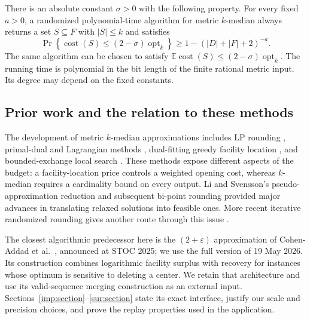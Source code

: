 \begin{theorem}\label{main:theorem}
There is an absolute constant $\sigma>0$ with the following property.
For every fixed $a>0$, a randomized polynomial-time algorithm for metric
$k$-median always returns a set $S\subseteq F$ with $|S|\le k$ and satisfies
\[
 \Pr\!\left\{\operatorname{cost}(S)
       \le(2-\sigma)\operatorname{opt}_k\right\}
 \ge 1-(|D|+|F|+2)^{-a}.
\]
The same algorithm can be chosen to satisfy
$\mathbb E\operatorname{cost}(S)\le(2-\sigma)\operatorname{opt}_k$.
The running time is polynomial in the bit length of the finite rational
metric input. Its degree may depend on the fixed constants.
\end{theorem}

\subsection{Prior work and the relation to these methods}

The development of metric $k$-median approximations includes LP rounding
\cite{CharikarGuhaTardosShmoys2002}, primal-dual and Lagrangian methods
\cite{JainVazirani2001}, dual-fitting greedy facility location
\cite{JMS2002,JainEtAl2003}, and bounded-exchange local search
\cite{Arya2004}.  These methods expose different aspects of the budget:
a facility-location price controls a weighted opening cost, whereas
$k$-median requires a cardinality bound on every output.  Li and
Svensson's pseudo-approximation reduction \cite{LiSvensson2016} and
subsequent bi-point rounding \cite{ByrkaEtAl2017,GowdaEtAl2023}
provided major advances in translating relaxed solutions into feasible
ones.  More recent iterative randomized rounding gives another route
through this issue \cite{ByrkaEtAl2026}.

The closest algorithmic predecessor here is the $(2+\varepsilon)$
approximation of Cohen-Addad et al.\ \cite{CGLSS2026}, announced at
STOC 2025; we use the full version of 19 May 2026.  Its construction
combines logarithmic facility surplus with recovery for instances
whose optimum is sensitive to deleting a center.  We retain that
architecture and use its valid-sequence merging construction as an
external input.  Sections~\ref{imp:section}--\ref{sur:section} state
its exact interface, justify our scale and precision choices, and
prove the replay properties used in the application.

